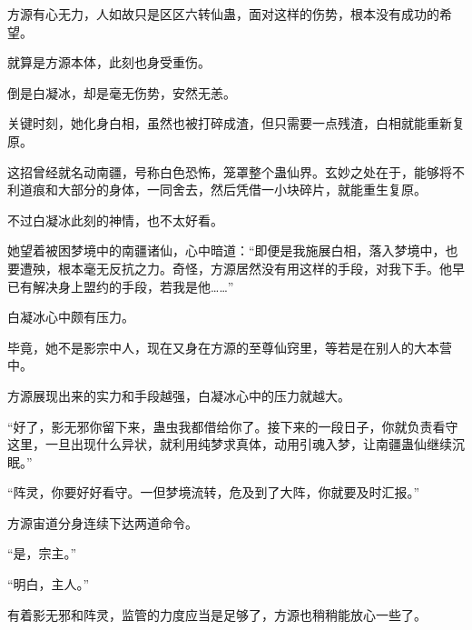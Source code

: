 \begin{this_body}
方源有心无力，人如故只是区区六转仙蛊，面对这样的伤势，根本没有成功的希望。

就算是方源本体，此刻也身受重伤。

倒是白凝冰，却是毫无伤势，安然无恙。

关键时刻，她化身白相，虽然也被打碎成渣，但只需要一点残渣，白相就能重新复原。

这招曾经就名动南疆，号称白色恐怖，笼罩整个蛊仙界。玄妙之处在于，能够将不利道痕和大部分的身体，一同舍去，然后凭借一小块碎片，就能重生复原。

不过白凝冰此刻的神情，也不太好看。

她望着被困梦境中的南疆诸仙，心中暗道：“即便是我施展白相，落入梦境中，也要遭殃，根本毫无反抗之力。奇怪，方源居然没有用这样的手段，对我下手。他早已有解决身上盟约的手段，若我是他……”

白凝冰心中颇有压力。

毕竟，她不是影宗中人，现在又身在方源的至尊仙窍里，等若是在别人的大本营中。

方源展现出来的实力和手段越强，白凝冰心中的压力就越大。

“好了，影无邪你留下来，蛊虫我都借给你了。接下来的一段日子，你就负责看守这里，一旦出现什么异状，就利用纯梦求真体，动用引魂入梦，让南疆蛊仙继续沉眠。”

“阵灵，你要好好看守。一但梦境流转，危及到了大阵，你就要及时汇报。”

方源宙道分身连续下达两道命令。

“是，宗主。”

“明白，主人。”

有着影无邪和阵灵，监管的力度应当是足够了，方源也稍稍能放心一些了。

\end{this_body}

